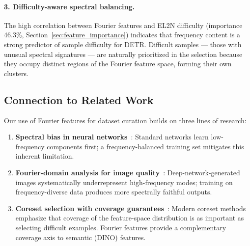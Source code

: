 \paragraph{3. Difficulty-aware spectral balancing.}
The high correlation between Fourier features and EL2N difficulty
(importance 46.3\%, Section~\ref{sec:feature_importance}) indicates that
frequency content is a strong predictor of sample difficulty for DETR.
Difficult samples --- those with unusual spectral signatures --- are naturally
prioritized in the selection because they occupy distinct regions of the
Fourier feature space, forming their own clusters.


\subsection{Connection to Related Work}
\label{sec:fourier_related}

Our use of Fourier features for dataset curation builds on three lines of
research:

\begin{enumerate}
    \item \textbf{Spectral bias in neural networks}~\cite{rahaman2019spectral,
          tancik2020fourier}: Standard networks learn low-frequency components
          first; a frequency-balanced training set mitigates this inherent
          limitation.

    \item \textbf{Fourier-domain analysis for image quality}~\cite{
          dzanic2020fourier}: Deep-network-generated images systematically
          underrepresent high-frequency modes; training on
          frequency-diverse data produces more spectrally faithful outputs.

    \item \textbf{Coreset selection with coverage
          guarantees}~\cite{blindcs2025, infomax2025}: Modern coreset methods
          emphasize that coverage of the feature-space distribution is as
          important as selecting difficult examples.  Fourier features provide
          a complementary coverage axis to semantic (DINO) features.
\end{enumerate}


